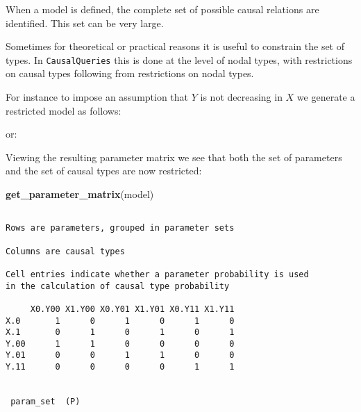 \documentclass[
  12pt,
]{book}
\newenvironment{Shaded}{\begin{snugshade}}{\end{snugshade}}
\newcommand{\KeywordTok}[1]{\textcolor[rgb]{0.13,0.29,0.53}{\textbf{#1}}}
\newcommand{\NormalTok}[1]{#1}
\newcommand{\OperatorTok}[1]{\textcolor[rgb]{0.81,0.36,0.00}{\textbf{#1}}}
\newcommand{\StringTok}[1]{\textcolor[rgb]{0.31,0.60,0.02}{#1}}
\begin{document}
When a model is defined, the complete set of possible causal relations are identified. This set can be very large.

Sometimes for theoretical or practical reasons it is useful to constrain the set of types. In \texttt{CausalQueries} this is done at the level of nodal types, with restrictions on causal types following from restrictions on nodal types.

For instance to impose an assumption that \(Y\) is not decreasing in \(X\) we generate a restricted model as follows:

\begin{Shaded}
\end{Shaded}

or:

\begin{Shaded}
\end{Shaded}

Viewing the resulting parameter matrix we see that both the set of parameters and the set of causal types are now restricted:

\begin{Shaded}
\begin{Highlighting}[]
\KeywordTok{get_parameter_matrix}\NormalTok{(model)}
\end{Highlighting}
\end{Shaded}

\begin{verbatim}

Rows are parameters, grouped in parameter sets

Columns are causal types

Cell entries indicate whether a parameter probability is used
in the calculation of causal type probability

     X0.Y00 X1.Y00 X0.Y01 X1.Y01 X0.Y11 X1.Y11
X.0       1      0      1      0      1      0
X.1       0      1      0      1      0      1
Y.00      1      1      0      0      0      0
Y.01      0      0      1      1      0      0
Y.11      0      0      0      0      1      1

 
 param_set  (P)
 
\end{verbatim}
\end{document}
